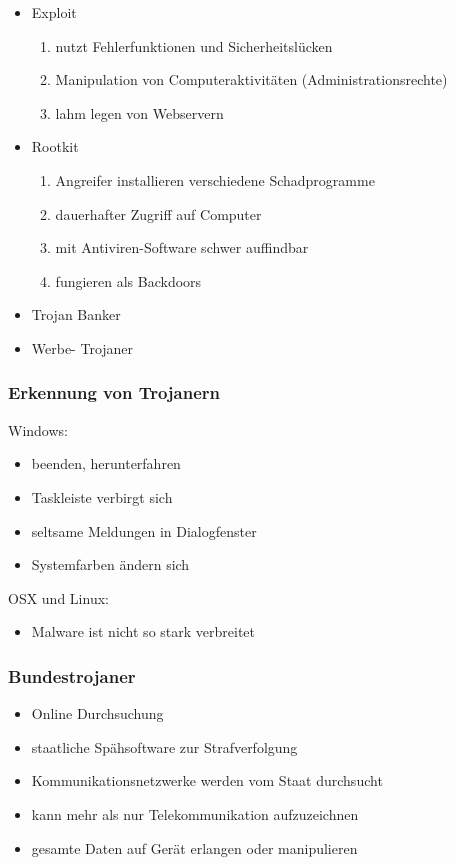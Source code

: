 \documentclass{beamer}
\begin{document}
\begin{frame}
	\begin{itemize}
		\item Exploit
			\begin{enumerate}
				\item nutzt Fehlerfunktionen und Sicherheitslücken
				\item Manipulation von Computeraktivitäten (Administrationsrechte)
				\item lahm legen von Webservern
			\end{enumerate}
		\item Rootkit
			\begin{enumerate}
				\item Angreifer installieren verschiedene Schadprogramme
				\item dauerhafter Zugriff auf Computer
				\item mit Antiviren-Software schwer auffindbar
				\item fungieren als Backdoors
			\end{enumerate}
		\item Trojan Banker
		\item Werbe- Trojaner
	\end{itemize}
\end{frame}

\begin{frame}
	\frametitle{Erkennung von Trojanern}
	Windows:
	\begin{itemize}
		\item beenden, herunterfahren
		\item Taskleiste verbirgt sich
		\item seltsame Meldungen in Dialogfenster
		\item Systemfarben ändern sich
	\end{itemize}
	OSX und Linux:
	\begin{itemize}
		\item Malware ist nicht so stark verbreitet
	\end{itemize}
\end{frame}


\begin{frame}
	\frametitle{Bundestrojaner}
	\begin{itemize}
		\item Online Durchsuchung
		\item staatliche Spähsoftware zur Strafverfolgung
		\item Kommunikationsnetzwerke werden vom Staat durchsucht
		\item kann mehr als nur Telekommunikation aufzuzeichnen
		\item gesamte Daten auf Gerät erlangen oder manipulieren
	\end{itemize}
\end{frame}
\end{document}
